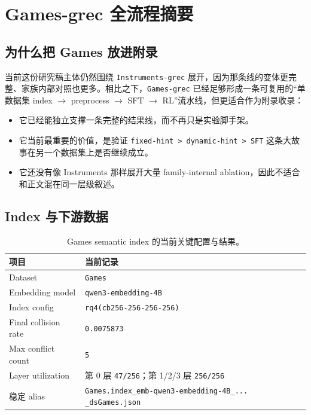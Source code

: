 \section{Games-grec 全流程摘要}

\subsection{为什么把 Games 放进附录}

当前这份研究稿主体仍然围绕 \texttt{Instruments-grec} 展开，因为那条线的变体更完整、家族内部对照也更多。相比之下，\texttt{Games-grec} 已经足够形成一条可复用的“单数据集 index $\rightarrow$ preprocess $\rightarrow$ SFT $\rightarrow$ RL”流水线，但更适合作为附录收录：

\begin{itemize}
\item 它已经能独立支撑一条完整的结果线，而不再只是实验脚手架。
\item 它当前最重要的价值，是验证 \texttt{fixed-hint > dynamic-hint > SFT} 这条大故事在另一个数据集上是否继续成立。
\item 它还没有像 Instruments 那样展开大量 family-internal ablation，因此不适合和正文混在同一层级叙述。
\end{itemize}

\subsection{Index 与下游数据}

\begin{table}[H]
\centering
\small
\setlength{\tabcolsep}{4pt}
\begin{tabular}{p{4.0cm} p{8.2cm}}
\toprule
项目 & 当前记录 \\
\midrule
Dataset & \texttt{Games} \\
Embedding model & \texttt{qwen3-embedding-4B} \\
Index config & \texttt{rq4(cb256-256-256-256)} \\
Final collision rate & \texttt{0.0075873} \\
Max conflict count & \texttt{5} \\
Layer utilization & 第 0 层 \texttt{47/256}；第 1/2/3 层 \texttt{256/256} \\
稳定 alias & \texttt{Games.index\_emb-qwen3-embedding-4B\_... \_dsGames.json} \\
\bottomrule
\end{tabular}
\caption{Games semantic index 的当前关键配置与结果。}
\end{table}

